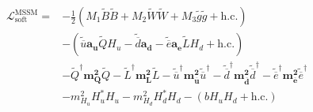 \begin{align*}
  \begin{split}
    \mathcal{L}_\text{soft}^\text{MSSM} = &-\frac{1}{2}\left(M_1\widetilde{B}\widetilde{B}+
    M_2\widetilde{W}\widetilde{W} + M_3\widetilde{g}\widetilde{g} + \text{h.c.}\right)\\
    &-\left(\widetilde{\overline{u}}\mathbf{a_u}\widetilde{Q}H_u-\widetilde{\overline{d}}\mathbf{a_d}-\widetilde{\overline{e}}\mathbf{a_e}\widetilde{L}H_d+\text{h.c.}\right)\\
    &-\widetilde{Q}^\dagger\mathbf{m_Q^2}\widetilde{Q}
     -\widetilde{L}^\dagger\mathbf{m_L^2}\widetilde{L}
     -\widetilde{\overline{u}}^\dagger\mathbf{m_{\overline{u}}^2}\widetilde{\overline{u}}^\dagger
     -\widetilde{\overline{d}}^\dagger\mathbf{m_{\overline{d}}^2}\widetilde{\overline{d}}^\dagger
     -\widetilde{\overline{e}}^\dagger\mathbf{m_{\overline{e}}^2}\widetilde{\overline{e}}^\dagger\\
     &-m^2_{H_u}H^*_uH_u-m^2_{H_d}H_d^*H_d-(bH_uH_d+\text{h.c.}) 
  \end{split}
\end{align*}
